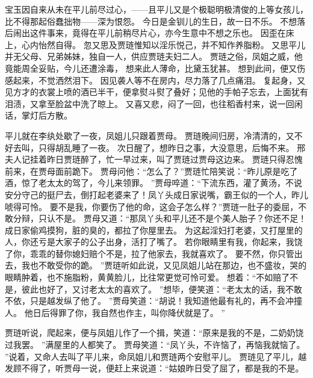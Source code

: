 宝玉因自来从未在平儿前尽过心，——且平儿又是个极聪明极清俊的上等女孩儿，比不得那起俗蠢拙物——深为恨怨。
今日是金钏儿的生日，故一日不乐。
不想落后闹出这件事来，竟得在平儿前稍尽片心，亦今生意中不想之乐也。
因歪在床上，心内怡然自得。
忽又思及贾琏惟知以淫乐悦己，并不知作养脂粉。
又思平儿并无父母、兄弟姊妹，独自一人，供应贾琏夫妇二人。
贾琏之俗，凤姐之威，他竟能周全妥贴，今儿还遭涂毒，
想来此人薄命，比黛玉犹甚。
想到此间，便又伤感起来，不觉洒然泪下。
因见袭人等不在房内，尽力落了几点痛泪。
复起身，又见方才的衣裳上喷的酒已半干，便拿熨斗熨了叠好；见他的手帕子忘去，上面犹有泪渍，又拿至脸盆中洗了晾上。
又喜又悲，闷了一回，也往稻香村来，说一回闲话，掌灯后方散。
\par
平儿就在李纨处歇了一夜，凤姐儿只跟着贾母。
贾琏晚间归房，冷清清的，又不好去叫，只得胡乱睡了一夜。
次日醒了，想昨日之事，大没意思，后悔不来。
邢夫人记挂着昨日贾琏醉了，忙一早过来，叫了贾琏过贾母这边来。
贾琏只得忍愧前来，在贾母面前跪下。
贾母问他：“怎么了？”贾琏忙陪笑说：“昨儿原是吃了酒，惊了老太太的驾了，今儿来领罪。
”贾母啐道：“下流东西，灌了黄汤，不说安分守己的挺尸去，倒打起老婆来了！凤丫头成日家说嘴，霸王似的一个人，昨儿唬得可怜。
要不是我，你要伤了他的命，这会子怎么样？”贾琏一肚子的委屈，不敢分辩，只认不是。
贾母又道：“那凤丫头和平儿还不是个美人胎子？你还不足！成日家偷鸡摸狗，脏的臭的，都拉了你屋里去。
为这起淫妇打老婆，又打屋里的人，你还亏是大家子的公子出身，活打了嘴了。
若你眼睛里有我，你起来，我饶了你，乖乖的替你媳妇赔个不是，拉了他家去，我就喜欢了。
要不然，你只管出去，我也不敢受你的跪。
”贾琏听如此说，又见凤姐儿站在那边，也不盛妆，哭的眼睛肿着，也不施脂粉，黄黄脸儿，比往常更觉可怜可爱。
想着：“不如赔了不是，彼此也好了，又讨老太太的喜欢了。
”想毕，便笑道：“老太太的话，我不敢不依，只是越发纵了他了。
”贾母笑道：“胡说！我知道他最有礼的，再不会冲撞人。
他日后得罪了你，我自然也作主，叫你降伏就是了。
”\par
贾琏听说，爬起来，便与凤姐儿作了一个揖，笑道：“原来是我的不是，二奶奶饶过我罢。
”满屋里的人都笑了。
贾母笑道：“凤丫头，不许恼了，再恼我就恼了。
”说着，又命人去叫了平儿来，命凤姐儿和贾琏两个安慰平儿。
贾琏见了平儿，越发顾不得了，听贾母一说，便赶上来说道：“姑娘昨日受了屈了，都是我的不是。
